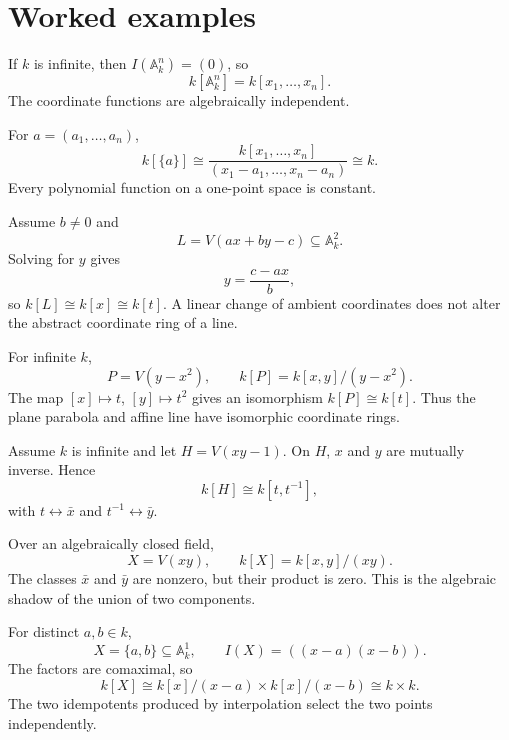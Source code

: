 
\section{Worked examples}
\label{sec:vi03-worked-examples}

\begin{example}
If \(k\) is infinite, then \(I(\mathbb A_k^n)=(0)\), so
\[
k[\mathbb A_k^n]=k[x_1,\dots,x_n].
\]
The coordinate functions are algebraically independent.
\end{example}

\begin{example}
For \(a=(a_1,\dots,a_n)\),
\[
k[\{a\}]
\cong
\frac{k[x_1,\dots,x_n]}{(x_1-a_1,\dots,x_n-a_n)}
\cong k.
\]
Every polynomial function on a one-point space is constant.
\end{example}

\begin{example}
Assume \(b\neq0\) and
\[
L=V(ax+by-c)\subseteq\mathbb A_k^2.
\]
Solving for \(y\) gives
\[
y=\frac{c-ax}{b},
\]
so \(k[L]\cong k[x]\cong k[t]\).  A linear change of ambient coordinates does not alter
the abstract coordinate ring of a line.
\end{example}

\begin{example}[Parabola]
For infinite \(k\),
\[
P=V(y-x^2),
\qquad
k[P]=k[x,y]/(y-x^2).
\]
The map \([x]\mapsto t\), \([y]\mapsto t^2\) gives an isomorphism \(k[P]\cong k[t]\).
Thus the plane parabola and affine line have isomorphic coordinate rings.
\end{example}

\begin{example}
Assume \(k\) is infinite and let \(H=V(xy-1)\).  On \(H\), \(x\) and \(y\) are mutually
inverse.  Hence
\[
k[H]\cong k[t,t^{-1}],
\]
with \(t\leftrightarrow\bar x\) and \(t^{-1}\leftrightarrow\bar y\).
\end{example}

\begin{example}
Over an algebraically closed field,
\[
X=V(xy),
\qquad
k[X]=k[x,y]/(xy).
\]
The classes \(\bar x\) and \(\bar y\) are nonzero, but their product is zero.  This is the
algebraic shadow of the union of two components.
\end{example}

\begin{example}
For distinct \(a,b\in k\),
\[
X=\{a,b\}\subseteq\mathbb A_k^1,
\qquad
I(X)=((x-a)(x-b)).
\]
The factors are comaximal, so
\[
k[X]\cong k[x]/(x-a)\times k[x]/(x-b)\cong k\times k.
\]
The two idempotents produced by interpolation select the two points independently.
\end{example}

